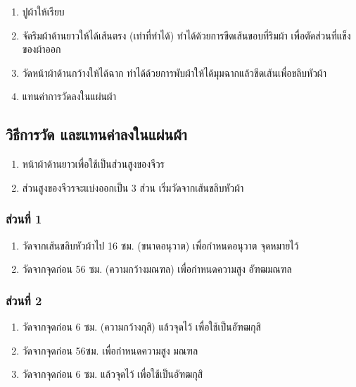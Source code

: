 \begin{enumerate}
\def\labelenumi{(\arabic{enumi})}
\item
  ปูผ้าให้เรียบ
\item
  จัดริมผ้าด้านยาวให้ได้เส้นตรง (เท่าที่ทำได้)
  ทำได้ด้วยการขีดเส้นขอบที่ริมผ้า เพื่อตัดส่วนที่แข็งของผ้าออก
\item
  วัดหน้าผ้าด้านกว้างให้ได้ฉาก
  ทำได้ด้วยการพับผ้าให้ได้มุมฉากแล้วขีดเส้นเพื่อขลิบหัวผ้า
\item
  แทนค่าการวัดลงในแผ่นผ้า
\end{enumerate}

\subsection{วิธีการวัด และแทนค่าลงในแผ่นผ้า}

\begin{enumerate}
\def\labelenumi{(\arabic{enumi})}
\item
  หน้าผ้าด้านยาวเพื่อใช้เป็นส่วนสูงของจีวร
\item
  ส่วนสูงของจีวรจะแบ่งออกเป็น 3 ส่วน เริ่มวัดจากเส้นขลิบหัวผ้า
\end{enumerate}

\subsubsection{ส่วนที่ 1}

\begin{enumerate}
\def\labelenumi{(\arabic{enumi})}
\item
  วัดจากเส้นขลิบหัวผ้าไป 16 ซม. (ขนาดอนุวาต) เพื่อกำหนดอนุวาต จุดหมายไว้
\item
  วัดจากจุดก่อน 56 ซม. (ความกว้างมณฑล) เพื่อกำหนดความสูง อัฑฒมณฑล
\end{enumerate}

\subsubsection{ส่วนที่ 2}

\begin{enumerate}
\def\labelenumi{(\arabic{enumi})}
\item
  วัดจากจุดก่อน 6 ซม. (ความกว้างกุสิ) แล้วจุดไว้ เพื่อใช้เป็นอัฑฒกุสิ
\item
  วัดจากจุดก่อน 56ซม. เพื่อกำหนดความสูง มณฑล
\item
  วัดจากจุดก่อน 6 ซม. แล้วจุดไว้ เพื่อใช้เป็นอัฑฒกุสิ
\end{enumerate}

